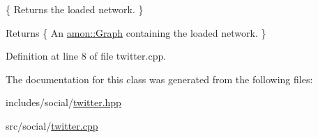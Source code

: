 \{ Returns the loaded network. \} 

\begin{DoxyReturn}{Returns}
\{ An \hyperlink{classamon_1_1_graph}{amon\-::\-Graph} containing the loaded network. \} 
\end{DoxyReturn}


Definition at line 8 of file twitter.\-cpp.



The documentation for this class was generated from the following files\-:\begin{DoxyCompactItemize}
\item 
includes/social/\hyperlink{twitter_8hpp}{twitter.\-hpp}\item 
src/social/\hyperlink{twitter_8cpp}{twitter.\-cpp}\end{DoxyCompactItemize}
